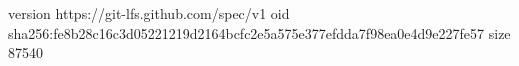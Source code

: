 version https://git-lfs.github.com/spec/v1
oid sha256:fe8b28c16c3d05221219d2164bcfc2e5a575e377efdda7f98ea0e4d9e227fe57
size 87540
